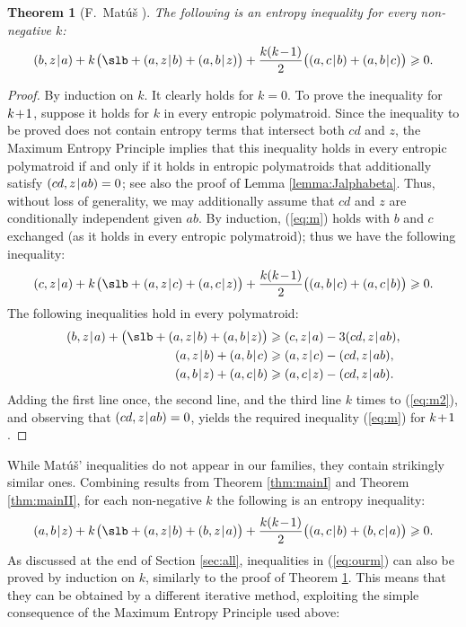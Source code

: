\documentclass[reqno]{amsart}
\newtheorem{theorem}{Theorem}
\theoremstyle{definition}
\newcommand\tsp{\mkern 1.5mu}
\def\|{\mkern1.5mu{|}\mkern1.5mu}
\renewcommand\ge{\geqslant}\renewcommand\le{\leqslant}
\def\m#1{\tsp{#1}\tsp}
\begin{document}
\begin{theorem}[F.~Mat\'u\v s \cite{M.infinf}]\label{thm:fminf}
The following is an entropy inequality for every non-negative $k$:
\begin{equation}\label{eq:m}
 (b,z\|a)+ k\tsp\big(\slb+(a,z\|b)+(a,b\|z)\big)
        + \frac{k(k\m-1)}2\big((a,c\|b)+(a,b\|c)\big) \ge 0.
\end{equation}
\end{theorem}

\begin{proof}

By induction on $k$. It clearly holds for $k=0$. To prove the inequality for
$k\m+1$, suppose it holds for $k$ in every entropic polymatroid. Since the
inequality to be proved does not contain entropy terms that intersect both
$cd$ and $z$, the Maximum Entropy Principle implies that this inequality
holds in every entropic polymatroid if and only if it holds in entropic
polymatroids that additionally satisfy $(cd,z\|ab)=0$; see also the proof of
Lemma \ref{lemma:Jalphabeta}. Thus, without loss of generality, we may
additionally assume that $cd$ and $z$ are conditionally independent given
$ab$. By induction, (\ref{eq:m}) holds with $b$ and $c$ exchanged (as it
holds in every entropic polymatroid); thus we have the following inequality:
\begin{equation}\label{eq:m2}
  (c,z\|a)+k\tsp\big(\slb+(a,z\|c)+(a,c\|z)\big)
     +\frac{k(k\m-1)}2\big((a,b\|c)+(a,c\|b)\big) \ge 0.
\end{equation}
The following inequalities hold in every polymatroid:
\begin{align*}
(b,z\|a)+ \big(\slb+(a,z\|b)+(a,b\|z)\big) &\ge (c,z\|a)-3(cd,z\|ab),\\
    (a,z\|b)+(a,b\|c) &\ge (a,z\|c)-(cd,z\|ab), \\
    (a,b\|z)+(a,c\|b) &\ge (a,c\|z)-(cd,z\|ab).
\end{align*}
Adding the first line once, the second line, and the third line $k$ times to
(\ref{eq:m2}), and observing that $(cd,z\|ab)=0$, yields the required inequality 
(\ref{eq:m}) for $k\m+1$.
\end{proof}

While Mat\'u\v s' inequalities do not appear in our families, they contain
strikingly similar ones. Combining results from Theorem \ref{thm:mainI} and
Theorem \ref{thm:mainII}, for each non-negative $k$ the following is an
entropy inequality:
\begin{equation}\label{eq:ourm}
  (a,b\|z)+k\tsp\big(\slb+(a,z\|b)+(b,z\|a)\big)+\frac{k(k\m-1)}2\big(
  (a,c\|b)+(b,c\|a)\big) \ge 0.
\end{equation}
As discussed at the end of Section \ref{sec:all}, inequalities in
(\ref{eq:ourm}) can also be proved by induction on $k$, similarly to the
proof of Theorem \ref{thm:fminf}. This means that they can be obtained by a
different iterative method, exploiting the simple consequence of the Maximum
Entropy Principle used above:
\end{document}
